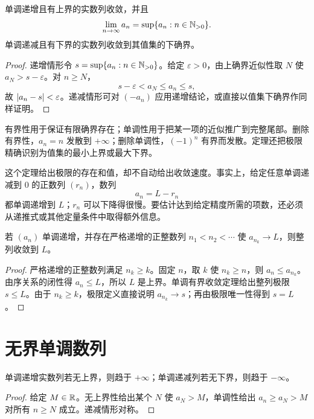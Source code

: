 \begin{theorem}[单调有界收敛定理]
单调递增且有上界的实数列收敛，并且
\[
\lim_{n\to\infty}a_n=\sup\{a_n:n\in\mathbb{N}_{>0}\}.
\]
单调递减且有下界的实数列收敛到其值集的下确界。
\end{theorem}

\begin{proof}
递增情形令 \(s=\sup\{a_n:n\in\mathbb{N}_{>0}\}\)。给定 \(\varepsilon>0\)，由上确界近似性取 \(N\) 使 \(a_N>s-\varepsilon\)。对 \(n\ge N\)，
\[
 s-\varepsilon<a_N\le a_n\le s,
\]
故 \(\left|a_n-s\right|<\varepsilon\)。递减情形可对 \((-a_n)\) 应用递增结论，或直接以值集下确界作同样证明。
\end{proof}

有界性用于保证有限确界存在；单调性用于把某一项的近似推广到完整尾部。删除有界性，\(a_n=n\) 发散到 \(+\infty\)；删除单调性，\((-1)^n\) 有界而发散。定理还把极限精确识别为值集的最小上界或最大下界。

这个定理给出极限的存在和值，却不自动给出收敛速度。事实上，给定任意单调递减到 \(0\) 的正数列 \((r_n)\)，数列
\[
 a_n=L-r_n
\]
都单调递增到 \(L\)；\(r_n\) 可以下降得很慢。要估计达到给定精度所需的项数，还必须从递推式或其他定量条件中取得额外信息。

\begin{corollary}
若 \((a_n)\) 单调递增，并存在严格递增的正整数列
\(n_1<n_2<\cdots\) 使 \(a_{n_k}\to L\)，则整列收敛到 \(L\)。
\end{corollary}

\begin{proof}
严格递增的正整数列满足 \(n_k\ge k\)。固定 \(n\)，取 \(k\) 使
\(n_k\ge n\)，则 \(a_n\le a_{n_k}\)。由序关系的闭性得
\(a_n\le L\)，所以 \(L\) 是上界。单调有界收敛定理给出整列极限
\(s\le L\)。由于 \(n_k\ge k\)，极限定义直接说明
\(a_{n_k}\to s\)；再由极限唯一性得到 \(s=L\)。
\end{proof}

\section{无界单调数列}


\begin{theorem}
单调递增实数列若无上界，则趋于 \(+\infty\)；单调递减列若无下界，则趋于 \(-\infty\)。
\end{theorem}

\begin{proof}
给定 \(M\in\mathbb{R}\)。无上界性给出某个 \(N\) 使 \(a_N>M\)，单调性给出 \(a_n\ge a_N>M\) 对所有 \(n\ge N\) 成立。递减情形对称。
\end{proof}

